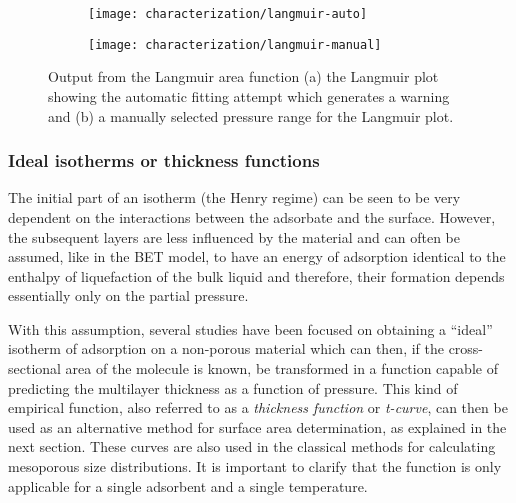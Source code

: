 \begin{figure}[!htb]
	\centering

	\begin{subfigure}{0.45\linewidth}
		\parbox[c]{0.1\linewidth}{\caption{}%
			\label{pyg:fgr:langmuirarea-auto}}
		\parbox[b]{0.85\linewidth}{%
			\texttt{[image: characterization/langmuir-auto]}}
	\end{subfigure}
	\begin{subfigure}{0.45\linewidth}
		\parbox[c]{0.1\linewidth}{\caption{}%
			\label{pyg:fgr:langmuirarea-manual}}
		\parbox[b]{0.85\linewidth}{%
			\texttt{[image: characterization/langmuir-manual]}}
	\end{subfigure}

	\caption{Output from the Langmuir area function (a) the Langmuir plot
		showing the automatic fitting attempt which generates a warning and (b) a manually
		selected pressure range for the Langmuir plot.}%
	\label{pyg:fgr:langmuirarea}

\end{figure}

\subsubsection{Ideal isotherms or thickness functions}\label{pyg:charac:tcurve}

The initial part of an isotherm (the Henry regime) can be seen to
be very dependent on the interactions between the adsorbate and the
surface. However, the subsequent layers are less influenced by the
material and can often be assumed, like in the BET model,
to have an energy of adsorption identical to the enthalpy of liquefaction
of the bulk liquid and therefore, their formation depends essentially
only on the partial pressure.

With this assumption, several studies have been focused on obtaining
a ``ideal'' isotherm of adsorption on a non-porous material which can
then, if the cross-sectional area of the molecule is known, be transformed
in a function capable of predicting the multilayer thickness
as a function of pressure. This kind of empirical function,
also referred to as a \textit{thickness function} or \textit{t-curve},
can then be used as an
alternative method for surface area determination, as explained in
the next section. These curves are also used in the classical methods
for calculating mesoporous size distributions. It is important to
clarify that the function is only applicable for a single adsorbent
and a single temperature.

